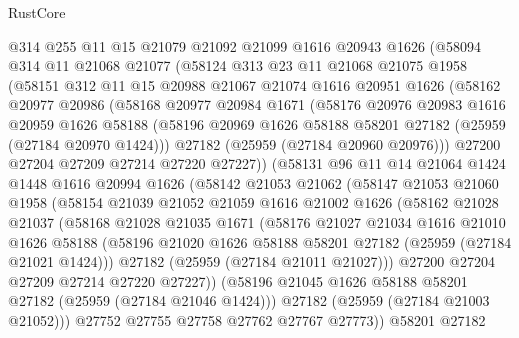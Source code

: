 \begin{lexlean}{RustCore}
\begin{coremodule}
    @314
    @255
    @11
    @15
    @21079
    @21092
    @21099
    @1616
    @20943
    @1626
    (@58094
      @314
      @11
      @21068
      @21077
      (@58124
        @313
        @23
        @11
        @21068
        @21075
        @1958
        (@58151
          @312
          @11
          @15
          @20988
          @21067
          @21074
          @1616
          @20951
          @1626
          (@58162
            @20977
            @20986
            (@58168
              @20977
              @20984
              @1671
              (@58176
                @20976
                @20983
                @1616
                @20959
                @1626
                @58188
                (@58196 @20969 @1626 @58188 @58201 @27182 (@25959 (@27184 @20970 @1424)))
                @27182
                (@25959 (@27184 @20960 @20976)))
              @27200
              @27204
              @27209
              @27214
              @27220
              @27227))
          (@58131
            @96
            @11
            @14
            @21064
            @1424
            @1448
            @1616
            @20994
            @1626
            (@58142
              @21053
              @21062
              (@58147
                @21053
                @21060
                @1958
                (@58154
                  @21039
                  @21052
                  @21059
                  @1616
                  @21002
                  @1626
                  (@58162
                    @21028
                    @21037
                    (@58168
                      @21028
                      @21035
                      @1671
                      (@58176
                        @21027
                        @21034
                        @1616
                        @21010
                        @1626
                        @58188
                        (@58196 @21020 @1626 @58188 @58201 @27182 (@25959 (@27184 @21021 @1424)))
                        @27182
                        (@25959 (@27184 @21011 @21027)))
                      @27200
                      @27204
                      @27209
                      @27214
                      @27220
                      @27227))
                  (@58196 @21045 @1626 @58188 @58201 @27182 (@25959 (@27184 @21046 @1424)))
                  @27182
                  (@25959 (@27184 @21003 @21052)))
                @27752
                @27755
                @27758
                @27762
                @27767
                @27773))
            @58201
            @27182

\end{coremodule}
\end{lexlean}
